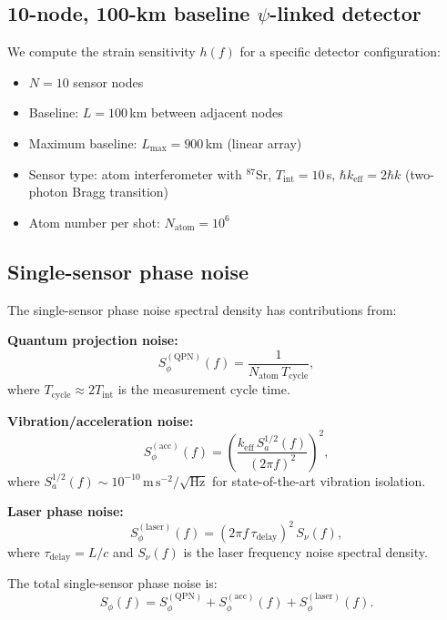 \documentclass[aps,prl,twocolumn,superscriptaddress,showpacs]{revtex4-2}
\theoremstyle{definition}
\begin{document}
\subsection{10-node, 100-km baseline $\psi$-linked detector}

We compute the strain sensitivity $h(f)$ for a specific detector
configuration:
\begin{itemize}
\item $N = 10$ sensor nodes
\item Baseline: $L = 100$\,km between adjacent nodes
\item Maximum baseline: $L_{\max} = 900$\,km (linear array)
\item Sensor type: atom interferometer with $^{87}$Sr,
$T_{\mathrm{int}} = 10$\,s, $\hbar k_{\mathrm{eff}} = 2\hbar k$
(two-photon Bragg transition)
\item Atom number per shot: $N_{\mathrm{atom}} = 10^6$
\end{itemize}

\subsection{Single-sensor phase noise}

The single-sensor phase noise spectral density has contributions from:

\textbf{Quantum projection noise:}
\begin{equation}
S_\phi^{(\mathrm{QPN})}(f) = \frac{1}{N_{\mathrm{atom}}\,T_{\mathrm{cycle}}},
\label{eq:qpn}
\end{equation}
where $T_{\mathrm{cycle}} \approx 2T_{\mathrm{int}}$ is the measurement
cycle time.

\textbf{Vibration/acceleration noise:}
\begin{equation}
S_\phi^{(\mathrm{acc})}(f) = \left(\frac{k_{\mathrm{eff}}\,S_a^{1/2}(f)}{(2\pi f)^2}\right)^2,
\label{eq:acc-noise}
\end{equation}
where $S_a^{1/2}(f) \sim 10^{-10}\,\mathrm{m\,s^{-2}/\sqrt{Hz}}$ for
state-of-the-art vibration isolation.

\textbf{Laser phase noise:}
\begin{equation}
S_\phi^{(\mathrm{laser})}(f) = (2\pi f\,\tau_{\mathrm{delay}})^2\,S_\nu(f),
\label{eq:laser-noise}
\end{equation}
where $\tau_{\mathrm{delay}} = L/c$ and $S_\nu(f)$ is the laser frequency
noise spectral density.

The total single-sensor phase noise is:
\begin{equation}
S_\phi(f) = S_\phi^{(\mathrm{QPN})} + S_\phi^{(\mathrm{acc})}(f)
+ S_\phi^{(\mathrm{laser})}(f).
\label{eq:total-phase-noise}
\end{equation}
\end{document}
